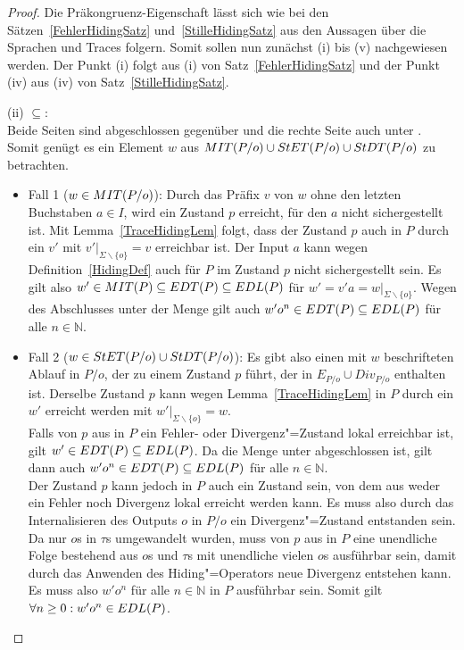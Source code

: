 \begin{proof}
  Die Präkongruenz-Eigenschaft lässt sich wie bei den
  Sätzen~\ref{FehlerHidingSatz} und~\ref{StilleHidingSatz} aus den Aussagen
  über die Sprachen und Traces folgern. Somit sollen nun zunächst (i) bis (v)
  nachgewiesen werden. Der Punkt (i) folgt aus (i) von
  Satz~\ref{FehlerHidingSatz} und der Punkt (iv) aus (iv) von
  Satz~\ref{StilleHidingSatz}.

  (ii) \glqq $\subseteq$\grqq{}:\\
  Beide Seiten sind abgeschlossen gegenüber \cont{} und die rechte Seite auch
  unter \prune{}. Somit genügt
  es ein Element $w$ aus $MIT (P/o)\cup StET (P/o)\cup StDT (P/o)$ zu
  betrachten.
  \begin{itemize}
    \item Fall 1 ($w\in MIT (P/o)$): Durch das Präfix $v$ von $w$ ohne den
      letzten Buchstaben $a\in I$, wird ein Zustand $p$ erreicht, für den $a$
      nicht sichergestellt ist. Mit Lemma~\ref{TraceHidingLem} folgt, dass der
      Zustand $p$ auch in $P$ durch ein $v'$ mit $v'|_{\Sigma\backslash\{o\}} =
      v$ erreichbar ist. Der Input $a$ kann wegen Definition~\ref{HidingDef}
      auch für $P$ im Zustand $p$ nicht sichergestellt sein. Es gilt also
      $w'\in MIT (P) \subseteq EDT (P) \subseteq EDL (P)$ für $w' = v'a =
      w|_{\Sigma\backslash\{o\}}$. Wegen des Abschlusses unter \cont{} der
      Menge \EDT{} gilt auch $w'o^n\in EDT (P)\subseteq EDL (P)$ für alle $n
      \in \mathbb{N}$.
    \item Fall 2 ($w\in StET (P/o)\cup StDT (P/o)$): Es gibt also einen mit
      $w$ beschrifteten Ablauf in $P/o$, der zu einem Zustand $p$ führt, der in
      $E_{P/o}\cup Div_{P/o}$ enthalten ist. Derselbe Zustand $p$ kann wegen
      Lemma~\ref{TraceHidingLem} in $P$ durch ein $w'$ erreicht werden mit
      $w'|_{\Sigma\backslash\{o\}} = w$.\\
      Falls von $p$ aus in $P$ ein Fehler- oder Divergenz"=Zustand lokal
      erreichbar ist, gilt $w'\in EDT (P)\subseteq EDL (P)$. Da die Menge
      \EDT{} unter \cont{} abgeschlossen ist, gilt dann auch $w'o^n\in EDT
      (P)\subseteq EDL (P)$ für alle $n\in\mathbb{N}$.\\
      Der Zustand $p$ kann jedoch in $P$ auch ein Zustand sein, von dem aus
      weder ein Fehler noch Divergenz lokal erreicht werden kann. Es muss also
      durch das Internalisieren des Outputs $o$ in $P/o$ ein Divergenz"=Zustand
      entstanden sein. Da nur $o$s in $\tau$s umgewandelt wurden, muss von $p$
      aus in $P$ eine unendliche Folge bestehend aus $o$s und $\tau$s mit
      unendliche vielen $o$s ausführbar sein, damit durch das Anwenden des
      Hiding"=Operators neue Divergenz entstehen kann. Es muss also $w'o^n$ für
      alle $n\in\mathbb{N}$ in $P$ ausführbar sein. Somit gilt $\forall n\geq
      0: w'o^n\in EDL (P)$.
  \end{itemize}


\end{proof}
